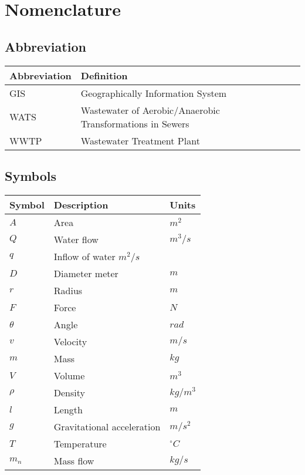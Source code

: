 \chapter*{Nomenclature}\label{ch:nomenclature}
\section*{Abbreviation}
\begin{longtable}[H]{p{80pt} p{300pt} p{40pt}}
\textbf{Abbreviation}	& \textbf{Definition} & \textbf{ } \\ \hline
GIS	  & Geographically Information System		&\\
WATS  & Wastewater of Aerobic/Anaerobic Transformations in Sewers &\\
WWTP  & Wastewater Treatment Plant &\\

\end{longtable}

\section*{Symbols}
\begin{longtable}[H]{p{80pt} p{280pt} p{50pt}} 
\textbf{Symbol}	& \textbf{Description} & \textbf{Units}  \\ \hline
$A$ & Area & $m^2$ \\ 
$Q$ & Water flow & $m^3/s$ \\
$q$ & Inflow of water $m^2/s$ \\
$D$ & Diameter meter & $m$ \\ 
$r$ & Radius & $m$ \\ 
$F$ & Force & $N$ \\ 
$\theta$ & Angle & $rad$ \\ 
$v$ & Velocity & $m/s$ \\ 
$m$ & Mass & $kg$ \\
$V$ & Volume & $m^3$ \\
$\rho$ & Density & $kg/m^3$ \\
$l$ & Length & $m$ \\
$g$ & Gravitational acceleration & $m/s^2$ \\
$T$ & Temperature & $^{\circ}C$ \\
$m_n$ & Mass flow & $kg/s$ \\

\end{longtable}


